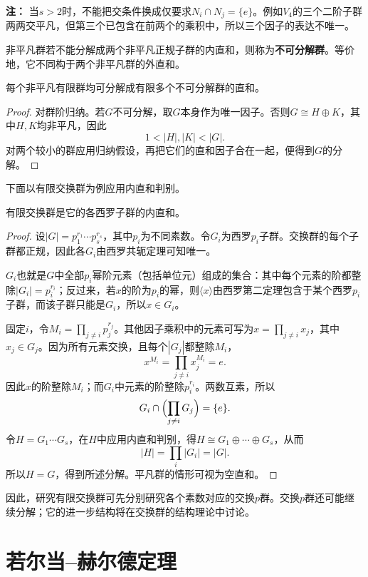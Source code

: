 \textbf{注：}
当$s>2$时，不能把交条件换成仅要求$N_i\cap N_j=\{e\}$。例如$V_4$的三个二阶子群两两交平凡，但第三个已包含在前两个的乘积中，所以三个因子的表达不唯一。


\begin{definition}
\label{p2:concept:c2-l1600}非平凡群若不能分解成两个非平凡正规子群的内直和，则称为\textbf{不可分解群}。等价地，它不同构于两个非平凡群的外直和。
\end{definition}

\begin{proposition}
每个非平凡有限群均可分解成有限多个不可分解群的直和。
\end{proposition}
\begin{proof}
对群阶归纳。若$G$不可分解，取$G$本身作为唯一因子。否则$G\cong H\oplus K$，其中$H,K$均非平凡，因此
\[
1<|H|,|K|<|G|.
\]
对两个较小的群应用归纳假设，再把它们的直和因子合在一起，便得到$G$的分解。
\end{proof}

下面以有限交换群为例应用内直和判别。

\begin{theorem}
有限交换群是它的各西罗子群的内直和。
\end{theorem}
\begin{proof}
设$|G|=p_1^{r_1}\cdots p_s^{r_s}$，其中$p_i$为不同素数。令$G_i$为西罗$p_i$子群。交换群的每个子群都正规，因此各$G_i$由西罗共轭定理可知唯一。

$G_i$也就是$G$中全部$p_i$幂阶元素（包括单位元）组成的集合：其中每个元素的阶都整除$|G_i|=p_i^{r_i}$；反过来，若$x$的阶为$p_i$的幂，则$\langle x\rangle$由西罗第二定理包含于某个西罗$p_i$子群，而该子群只能是$G_i$，所以$x\in G_i$。

固定$i$，令$M_i=\prod_{j\ne i}p_j^{r_j}$。其他因子乘积中的元素可写为$x=\prod_{j\ne i}x_j$，其中$x_j\in G_j$。因为所有元素交换，且每个$|G_j|$都整除$M_i$，
\[
x^{M_i}=\prod_{j\ne i}x_j^{M_i}=e.
\]
因此$x$的阶整除$M_i$；而$G_i$中元素的阶整除$p_i^{r_i}$。两数互素，所以
\[
G_i\cap\Bigl(\prod_{j\ne i}G_j\Bigr)=\{e\}.
\]
令$H=G_1\cdots G_s$，在$H$中应用内直和判别，得$H\cong G_1\oplus\cdots\oplus G_s$，从而
\[
|H|=\prod_i|G_i|=|G|.
\]
所以$H=G$，得到所述分解。平凡群的情形可视为空直和。
\end{proof}

因此，研究有限交换群可先分别研究各个素数对应的交换$p$群。交换$p$群还可能继续分解；它的进一步结构将在交换群的结构理论中讨论。

\section{若尔当--赫尔德定理}



